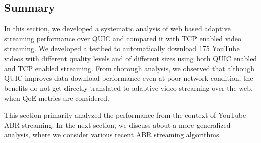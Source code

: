 \subsection{Summary}
In this section, we developed a systematic analysis of web based adaptive streaming performance over \ac{QUIC} and compared it with \ac{TCP} enabled video streaming. We developed a testbed to automatically download $175$ YouTube videos with different quality levels and of different sizes using both \ac{QUIC} enabled and \ac{TCP} enabled streaming. From thorough analysis, we observed that although \ac{QUIC} improves data download performance even at poor network condition, the benefits do not get directly translated to adaptive video streaming over the web, when \ac{QoE} metrics are considered. 

This section primarily analyzed the performance from the context of YouTube \ac{ABR} streaming. In the next section, we discuss about a more generalized analysis, where we consider various recent \ac{ABR} streaming algorithms. 